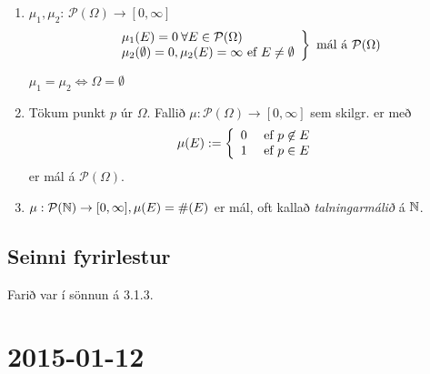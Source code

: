 \documentclass[12pt]{book} \usepackage[utf8]{inputenc}
\newcommand{\cP}{\mathcal{P}} \newcommand{\cF}{\mathcal{F}}
\begin{document}
\subsection{}

\begin{daemi}
  \begin{enumerate}[\arabic*.]
  \item $\mu_1, \mu_2$: $\cP(\Omega) \to [0, \infty]$
    \[ \left. \begin{array}{l}
                \mu_1 (E) = 0 \: \forall E \in \cP(\Omega)\\
                \mu_2 (\emptyset) = 0, \mu_2(E)
                = \infty \Ef E \neq \emptyset \\
              \end{array}
            \right\} \text{ mál á $\cP(\Omega)$}
            \]
            \begin{ath}
              $\mu_1 = \mu_2 \Leftrightarrow \Omega = \emptyset$
            \end{ath}


          \item Tökum punkt $p$ úr $\Omega$. Fallið
            $\mu: \cP(\Omega) \to [0,\infty]$ sem skilgr. er
            með
            \[ \mu(E) := \left\{ \begin{array}{l l} 0 & \text{ ef } p \not\in E\\ 1 & \text{ ef } p
            \in E \end{array} \right. \] er mál á $\cP(\Omega)$.

          \item $\mu: \cP(\N) \to [0, \infty], \mu(E) = \#(E)$ er
            mál, oft kallað \emph{talningarmálið} á $\mathbb{N}$.
          \end{enumerate}


        \end{daemi}

        \section{Seinni fyrirlestur}

        Farið var í sönnun á 3.1.3.

        \chapter{2015-01-12}
\end{document}

